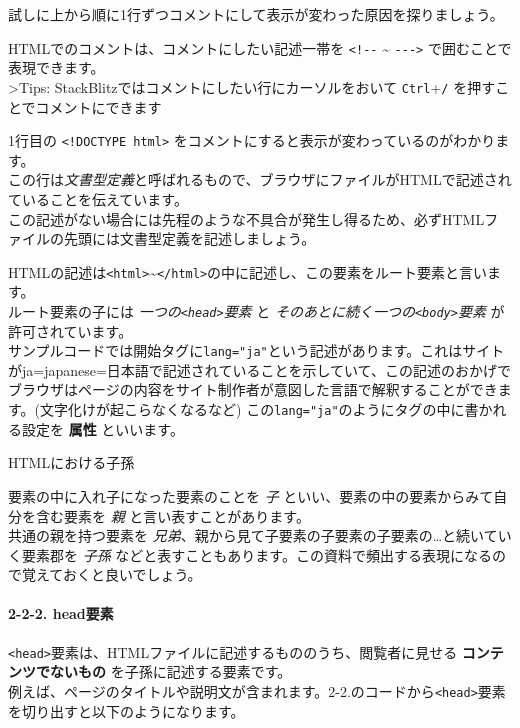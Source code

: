 試しに上から順に1行ずつコメントにして表示が変わった原因を探りましょう。

HTMLでのコメントは、コメントにしたい記述一帯を \texttt{\textless{}!-\/-}
\textasciitilde{} \texttt{-\/-\/-\textgreater{}}
で囲むことで表現できます。\\
\textgreater Tips: StackBlitzではコメントにしたい行にカーソルをおいて
\texttt{Ctrl}+\texttt{/} を押すことでコメントにできます

1行目の \texttt{\textless{}!DOCTYPE\ html\textgreater{}}
をコメントにすると表示が変わっているのがわかります。\\
この行は\emph{文書型定義}と呼ばれるもので、ブラウザにファイルがHTMLで記述されていることを伝えています。\\
この記述がない場合には先程のような不具合が発生し得るため、必ずHTMLファイルの先頭には文書型定義を記述しましょう。

HTMLの記述は\texttt{\textless{}html\textgreater{}}\textasciitilde{}\texttt{\textless{}/html\textgreater{}}の中に記述し、この要素をルート要素と言います。\\
ルート要素の子には
\emph{一つの\texttt{\textless{}head\textgreater{}}要素} と
\emph{そのあとに続く一つの\texttt{\textless{}body\textgreater{}}要素}
が許可されています。\\
サンプルコードでは開始タグに\texttt{lang="ja"}という記述があります。これはサイトがja=japanese=日本語で記述されていることを示していて、この記述のおかげでブラウザはページの内容をサイト制作者が意図した言語で解釈することができます。(文字化けが起こらなくなるなど)
この\texttt{lang="ja"}のようにタグの中に書かれる設定を \textbf{属性}
といいます。

HTMLにおける子孫

要素の中に入れ子になった要素のことを \emph{子}
といい、要素の中の要素からみて自分を含む要素を \emph{親}
と言い表すことがあります。\\
共通の親を持つ要素を
\emph{兄弟}、親から見て子要素の子要素の子要素の\ldots と続いていく要素郡を
\emph{子孫}
などと表すこともあります。この資料で頻出する表現になるので覚えておくと良いでしょう。

\paragraph{2-2-2. head要素}\label{headux8981ux7d20}

\texttt{\textless{}head\textgreater{}}要素は、HTMLファイルに記述するもののうち、閲覧者に見せる
\textbf{コンテンツでないもの} を子孫に記述する要素です。\\
例えば、ページのタイトルや説明文が含まれます。2-2.のコードから\texttt{\textless{}head\textgreater{}}要素を切り出すと以下のようになります。

